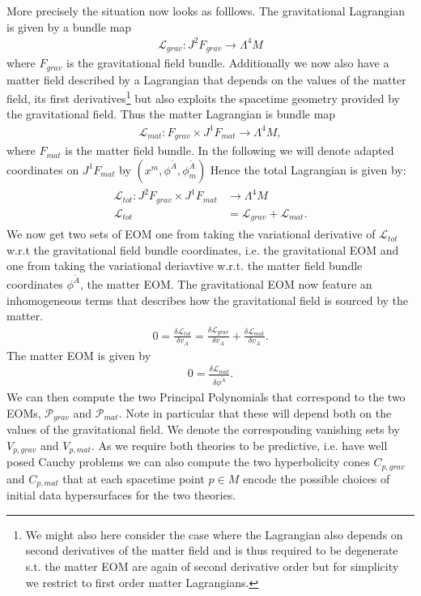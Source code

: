 \documentclass[a4paper,12pt, DIV=14, BCOR=5mm, twoside, headsepline, numbers=noenddot]{scrbook}
\begin{document}
More precisely the situation now looks as folllows.
The gravitational Lagrangian is given by a bundle map 
\begin{align}
    \mathcal{L}_{grav} : J^2F_{grav} \longrightarrow \Lambda^4M
\end{align}
where $F_{grav}$ is the gravitational field bundle. Additionally we now also have a matter field described by a Lagrangian that depends on the values of the matter field, its first derivatives\footnote{We might also here consider the case where the Lagrangian also depends on second derivatives of the matter field and is thus required to be degenerate s.t. the matter EOM are again of second derivative order but for simplicity we restrict to first order matter Lagrangians.} but also exploits the spacetime geometry provided by the gravitational field. Thus the matter Lagrangian is bundle map
\begin{align}
    \mathcal{L}_{mat} : F_{grav} \times J^1F_{mat} \longrightarrow \Lambda^4M,
\end{align}
where $F_{mat}$ is the matter field bundle. In the following we will denote adapted coordinates on $J^1F_{mat}$ by $(x^m,\phi^{\tilde{A}},\phi^{\tilde{A}}_m)$ Hence the total Lagrangian is given by:
\begin{align}
\begin{aligned}
    \mathcal{L}_{tot} : J^2F_{grav} \times J^1F_{mat} &\longrightarrow \Lambda^4M \\
    \mathcal{L}_{tot} &= \mathcal{L}_{grav} + \mathcal{L}_{mat}.
\end{aligned}
\end{align}
We now get two sets of EOM one from taking the variational derivative of $\mathcal{L}_{tot}$ w.r.t the gravitational field bundle coordinates, i.e. the gravitational EOM and one from taking the variational deriavtive w.r.t. the matter field bundle coordinates $\phi^{\tilde{A}}$, the matter EOM.
The gravitational EOM now feature an inhomogeneous terms that describes how the gravitational field is sourced by the matter.
\begin{align}
    0 = \frac{\delta \mathcal{L}_{tot}}{\delta v_A} = \frac{\delta \mathcal{L}_{grav}}{\delta v_A} + \frac{\delta \mathcal{L}_{mat}}{\delta v_A}.
\end{align}
The matter EOM is given by 
\begin{align}
    0 = \frac{\delta \mathcal{L}_{mat}}{\delta \phi^{\tilde{A}}}.
\end{align}
We can then compute the two Principal Polynomials that correspond to the two EOMs, $\mathcal{P}_{grav}$ and $\mathcal{P}_{mat}$. Note in particular that these will depend both on the values of the gravitational field. We denote the corresponding vanishing sets by $V_{p,grav}$ and $V_{p,mat}$. As we require both theories to be predictive, i.e. have well posed Cauchy problems we can also compute the two hyperbolicity cones $C_{p,grav}$ and $C_{p,mat}$ that at each spacetime point $p\in M$ encode the possible choices of initial data hypersurfaces for the two theories. 
\end{document}
